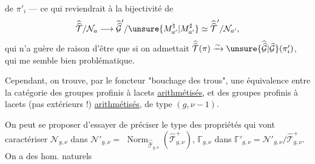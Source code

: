 
 de $\pi'_i$ --- ce qui
reviendrait à la bijectivité de
\[
\widehat{\widehat{\mathcal T}}/\mathcal N_a
\longrightarrow
\widehat{\widehat{\mathcal G}}'/\unsure{M_{a'}^{\natural}|M_{a'}^{\sharp}}
\simeq \widehat{\widehat{\mathcal T}}'/\mathcal N_{a'},
\]
qui n'a guère de raison d'être que si
on admettait
$\widehat{\widehat{\mathcal T}}(\pi)\xrightarrow{\sim}\unsure{\widehat{\widehat{\mathcal G}}|\widehat{\mathcal G}}(\pi'_i)$,
qui me semble bien problématique.

Cependant, on trouve, par le foncteur
"bouchage des trous", une équivalence
entre la catégorie des 
groupes profinis à lacets  \uline{arithmétisés},
et des groupes profinis à lacets
(pas extérieurs !) \uline{arithmétisés}, de type
$(g,\nu-1)$.

On peut se proposer d'essayer de
préciser  le type des propriétés
qui vont caractériser $\mathcal N_{g,\nu}$ dans $\mathcal N'_{g,\nu}=$
$\operatorname{Norm}_{\widehat{\widehat{\mathcal T}}_{g,\nu}}
(\widehat{\mathcal T}_{g,\nu}^{+})$,
$\mathbb{\Gamma}_{g,\nu}$
dans $\mathbb{\Gamma}'_{g,\nu}=\mathcal N'_{g,\nu}/\widehat{\mathcal T}_{g,\nu}^{+}$.
On a des hom. naturels



